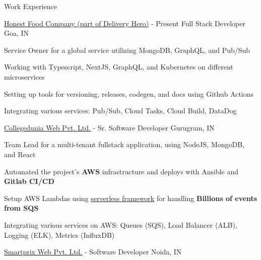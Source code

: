 \documentclass[../resume.tex]{subfiles}
\begin{document}
\begin{rSection}{Work Experience}

\begin{rSubsection}
    {\href{https://www.honestfoodcompany.de/}{Honest Food Company (part of Delivery Hero)}}
    {  - Present }
    {Full Stack Developer}
    {Goa, IN}

    \item Service Owner for a global service utilizing MongoDB, GraphQL, and Pub/Sub
    \item Working with Typescript, NextJS, GraphQL, and Kubernetes on different microservices
    \item Setting up tools for versioning, releases, codegen, and docs using Github Actions
    \item Integrating various services: Pub/Sub, Cloud Tasks, Cloud Build, DataDog

\end{rSubsection}

\begin{rSubsection}
    {\href{https://collegedunia.com}{Collegedunia Web Pvt. Ltd.}}
    {  -  }
    {Sr. Software Developer}
    {Gurugram, IN}

    \item Team Lead for a multi-tenant fullstack application, using NodeJS, MongoDB, and React
    \item Automated the project's \textbf{AWS} infrastructure and deploys with Ansible and \textbf{Gitlab CI/CD}
    \item Setup AWS Lambdas using \href{https://www.serverless.com/}{serverless framework} for handling \textbf{Billions of events from SQS}
    \item Integrating various services on AWS: Queues (SQS), Load Balancer (ALB), Logging (ELK), Metrics (InfluxDB)

\end{rSubsection}

\begin{rSubsection}
    {\href{https://www.smartprix.com}{Smartprix Web Pvt. Ltd.}}
    {  -  }
    {Software Developer}
    {Noida, IN}


\end{rSubsection}
\end{rSection}
\end{document}
